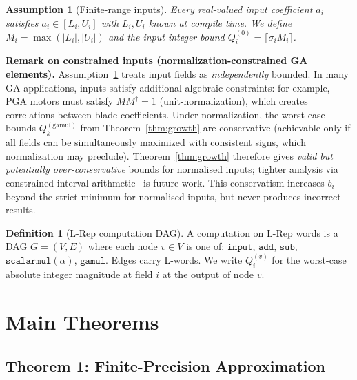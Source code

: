 \documentclass[11pt,a4paper]{article}
\theoremstyle{definition}
\newtheorem{definition}{Definition}[section]
\theoremstyle{plain}
\newtheorem{assumption}{Assumption}[section]
\theoremstyle{remark}
\begin{document}
\begin{assumption}[Finite-range inputs]
\label{ass:range}
Every real-valued input coefficient $a_i$ satisfies
$a_i \in [L_i, U_i]$ with $L_i, U_i$ known at compile time.
We define $M_i = \max(|L_i|, |U_i|)$ and the input integer bound
$Q_i^{(0)} = \lceil \sigma_i M_i \rceil$.
\end{assumption}

\begin{warningbox}
\textbf{Remark on constrained inputs (normalization-constrained GA elements).}
Assumption~\ref{ass:range} treats input fields as \emph{independently}
bounded.
In many GA applications, inputs satisfy additional algebraic constraints:
for example, PGA motors must satisfy $MM^\dagger = 1$
(unit-normalization), which creates correlations between blade
coefficients.
Under normalization, the worst-case bounds $Q_k^{(\mathrm{gamul})}$
from Theorem~\ref{thm:growth} are conservative (achievable only if all
fields can be simultaneously maximized with consistent signs, which
normalization may preclude).
Theorem~\ref{thm:growth} therefore gives \emph{valid but potentially
over-conservative} bounds for normalised inputs; tighter analysis
via constrained interval arithmetic~\cite{rump1999} is future work.
This conservatism increases $b_i$ beyond the strict minimum for
normalised inputs, but never produces incorrect results.
\end{warningbox}

\begin{definition}[L-Rep computation DAG]
A computation on L-Rep words is a DAG $G=(V,E)$ where each node
$v \in V$ is one of: $\mathtt{input}$, $\mathtt{add}$, $\mathtt{sub}$,
$\mathtt{scalarmul}(\alpha)$, $\mathtt{gamul}$.
Edges carry L-words.
We write $Q_i^{(v)}$ for the worst-case absolute integer magnitude
at field $i$ at the output of node $v$.
\end{definition}

\section{Main Theorems}
\label{sec:main}

\subsection{Theorem 1: Finite-Precision Approximation}
\label{sec:approx}
\end{document}
